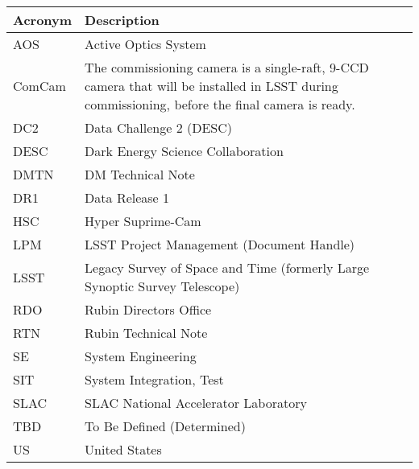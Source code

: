 \addtocounter{table}{-1}
\begin{longtable}{p{}p{}}\hline
\textbf{Acronym} & \textbf{Description}  \\\hline

AOS & Active Optics System \\\hline
ComCam & The commissioning camera is a single-raft, 9-CCD camera that will be installed in LSST during commissioning, before the final camera is ready. \\\hline
DC2 & Data Challenge 2 (DESC) \\\hline
DESC & Dark Energy Science Collaboration \\\hline
DMTN & DM Technical Note \\\hline
DR1 & Data Release 1 \\\hline
HSC & Hyper Suprime-Cam \\\hline
LPM & LSST Project Management (Document Handle) \\\hline
LSST & Legacy Survey of Space and Time (formerly Large Synoptic Survey Telescope) \\\hline
RDO & Rubin Directors Office \\\hline
RTN & Rubin Technical Note \\\hline
SE & System Engineering \\\hline
SIT & System Integration, Test \\\hline
SLAC & SLAC National Accelerator Laboratory \\\hline
TBD & To Be Defined (Determined) \\\hline
US & United States \\\hline
\end{longtable}
